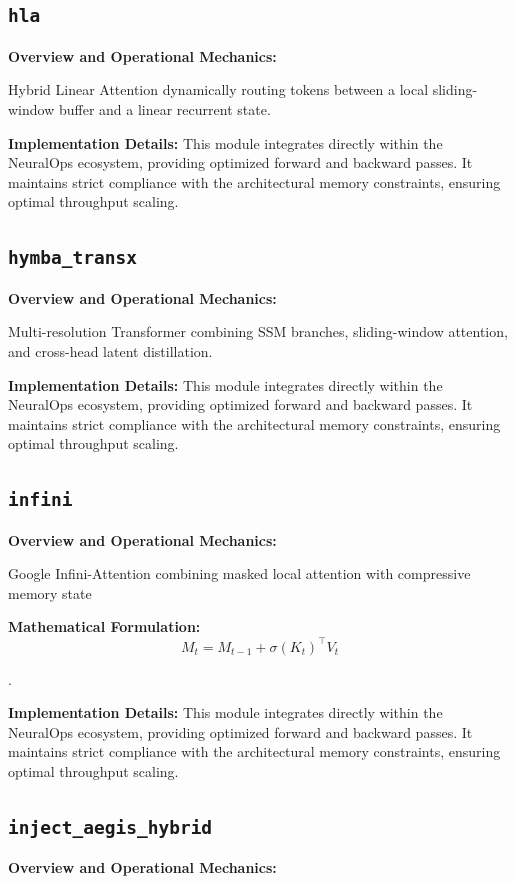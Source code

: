 \documentclass[10pt,twocolumn,letterpaper]{article}
\begin{document}
\subsection{\texttt{hla}}
\textbf{Overview and Operational Mechanics:}

Hybrid Linear Attention dynamically routing tokens between a local sliding-window buffer and a linear recurrent state.

\textbf{Implementation Details:}
This module integrates directly within the NeuralOps ecosystem, providing optimized forward and backward passes. It maintains strict compliance with the architectural memory constraints, ensuring optimal throughput scaling.

\subsection{\texttt{hymba\_transx}}
\textbf{Overview and Operational Mechanics:}

Multi-resolution Transformer combining SSM branches, sliding-window attention, and cross-head latent distillation.

\textbf{Implementation Details:}
This module integrates directly within the NeuralOps ecosystem, providing optimized forward and backward passes. It maintains strict compliance with the architectural memory constraints, ensuring optimal throughput scaling.

\subsection{\texttt{infini}}
\textbf{Overview and Operational Mechanics:}

Google Infini-Attention combining masked local attention with compressive memory state

\textbf{Mathematical Formulation:}
\begin{equation}
M_t = M_{t-1} + \sigma(K_t)^\top V_t
\end{equation}

.

\textbf{Implementation Details:}
This module integrates directly within the NeuralOps ecosystem, providing optimized forward and backward passes. It maintains strict compliance with the architectural memory constraints, ensuring optimal throughput scaling.

\subsection{\texttt{inject\_aegis\_hybrid}}
\textbf{Overview and Operational Mechanics:}
\end{document}
